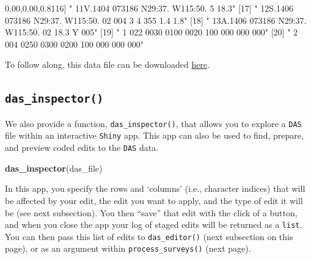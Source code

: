 \documentclass[
]{book}
\newenvironment{Shaded}{\begin{snugshade}}{\end{snugshade}}
\newcommand{\DecValTok}[1]{\textcolor[rgb]{0.00,0.00,0.81}{#1}}
\newcommand{\FunctionTok}[1]{\textcolor[rgb]{0.13,0.29,0.53}{\textbf{#1}}}
\newcommand{\NormalTok}[1]{#1}
\newcommand{\StringTok}[1]{\textcolor[rgb]{0.31,0.60,0.02}{#1}}
\begin{document}
\begin{Shaded}
\begin{Highlighting}[]
\NormalTok{[}\DecValTok{16}\NormalTok{] }\StringTok{" 11V.1404   073186 N29:37.   W115:50.      5           18.3"}                    
\NormalTok{[}\DecValTok{17}\NormalTok{] }\StringTok{" 12S.1406   073186 N29:37.   W115:50.     02  004    3    4  355  1.4  1.8"}     
\NormalTok{[}\DecValTok{18}\NormalTok{] }\StringTok{" 13A.1406   073186 N29:37.   W115:50.     02 18.3         Y  005"}               
\NormalTok{[}\DecValTok{19}\NormalTok{] }\StringTok{"   1                                     022 0030 0100 0020  100  000  000  000"}
\NormalTok{[}\DecValTok{20}\NormalTok{] }\StringTok{"   2                                     004 0250 0300 0200  100  000  000  000"}
\end{Highlighting}
\end{Shaded}

To follow along, this data file can be downloaded \href{https://raw.githubusercontent.com/emk-noaa/LTAvignette/main/data/surveys/CenPac1986-2020_Final_alb.das?token=GHSAT0AAAAAACFPESQVLR7DOE4I3UD4UJ2YZGRILEQ}{here}.

\hypertarget{das_inspector}{%
\subsection*{\texorpdfstring{\texttt{das\_inspector()}}{das\_inspector()}}\label{das_inspector}}

We also provide a function, \texttt{das\_inspector()}, that allows you to explore a \texttt{DAS} file within an interactive \texttt{Shiny} app. This app can also be used to find, prepare, and preview coded edits to the \texttt{DAS} data.

\begin{Shaded}
\begin{Highlighting}[]
\FunctionTok{das\_inspector}\NormalTok{(das\_file)}
\end{Highlighting}
\end{Shaded}

In this app, you specify the rows and `columns' (i.e., character indices) that will be affected by your edit, the edit you want to apply, and the type of edit it will be (see next subsection). You then ``save'' that edit with the click of a button, and when you close the app your log of staged edits will be returned as a \texttt{list}. You can then pass this list of edits to \texttt{das\_editor()} (next subsection on this page), or as an argument within \texttt{process\_surveys()} (next page).
\end{document}
